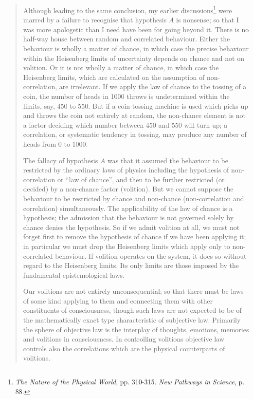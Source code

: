 \begin{quote}
    Although leading to the same conclusion, my earlier discussions\footnote{\emph{The Nature of the Physical World}, pp. 310-315.  \emph{New Pathways in Science}, p. 88.} were marred by a failure to recognise that hypothesis $A$ is nonsense; so that I was more apologetic than I need have been for going beyond it.  There is no half-way house between random and correlated behaviour.  Either the behaviour is wholly a matter of chance, in which case the precise behaviour within the Heisenberg limits of uncertainty depends on chance and not on volition.  Or it is not wholly a matter of chance, in which case the Heisenberg limits, which are calculated on the assumption of non-correlation, are irrelevant.  If we apply the law of chance to the tossing of a coin, the number of heads in 1000 throws is undetermined within the limits, say, 450 to 550.  But if a coin-tossing machine is used which picks up and throws the coin not entirely at random, the non-chance element is not a factor deciding which number between 450 and 550 will turn up; a correlation, or systematic tendency in tossing, may produce any number of heads from 0 to 1000.  

    The fallacy of hypothesis $A$ was that it assumed the behaviour to be restricted by the ordinary laws of physics including the hypothesis of non-correlation or ``law of chance'', and then to be further restricted (or decided) by a non-chance factor (volition).  But we cannot suppose the behaviour to be restricted by chance and non-chance (non-correlation and correlation) simultaneously.  The applicability of the law of chance is a hypothesis; the admission that the behaviour is not governed solely by chance denies the hypothesis.  So if we admit volition at all, we must not forget first to remove the hypothesis of chance if we have been applying it; in particular we must drop the Heisenberg limits which apply only to non-correlated behaviour.  If volition operates on the system, it does so without regard to the Heisenberg limits.  Its only limits are those imposed by the fundamental epistemological laws.  

    Our volitions are not entirely unconsequential; so that there must be laws of some kind applying to them and connecting them with other constituents of consciousness, though such laws are not expected to be of the mathematically exact type characteristic of subjective law.  Primarily the sphere of objective law is the interplay of thoughts, emotions, memories and volitions in consciousness.  In controlling volitions objective law controls also the correlations which are the physical counterparts of volitions.  


\end{quote}
